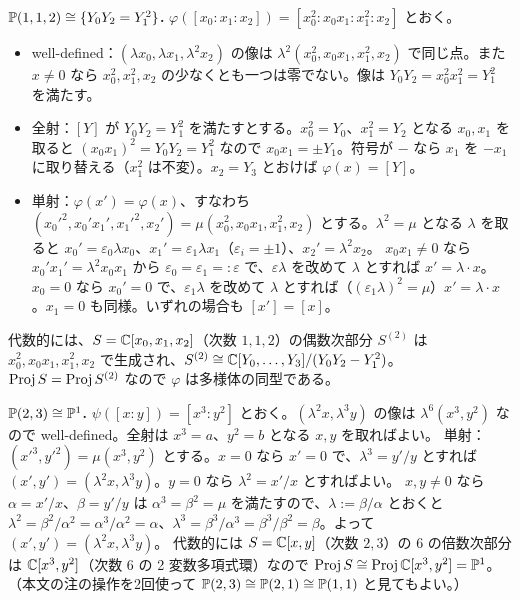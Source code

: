 \textbf{$\mathbb{P}(1,1,2)\cong\{Y_0Y_2 = Y_1^2\}$.}
$\varphi([x_0:x_1:x_2]) = [x_0^2:x_0x_1:x_1^2:x_2]$ とおく。
\begin{itemize}
\item well-defined：$(\lambda x_0,\lambda x_1,\lambda^2x_2)$ の像は $\lambda^2(x_0^2,x_0x_1,x_1^2,x_2)$ で同じ点。また $x\neq0$ なら $x_0^2,x_1^2,x_2$ の少なくとも一つは零でない。像は $Y_0Y_2 = x_0^2x_1^2 = Y_1^2$ を満たす。
\item 全射：$[Y]$ が $Y_0Y_2 = Y_1^2$ を満たすとする。$x_0^2 = Y_0$、$x_1^2 = Y_2$ となる $x_0,x_1$ を取ると $(x_0x_1)^2 = Y_0Y_2 = Y_1^2$ なので $x_0x_1 = \pm Y_1$。符号が $-$ なら $x_1$ を $-x_1$ に取り替える（$x_1^2$ は不変）。$x_2 = Y_3$ とおけば $\varphi(x) = [Y]$。
\item 単射：$\varphi(x') = \varphi(x)$、すなわち $(x_0'^2,x_0'x_1',x_1'^2,x_2') = \mu(x_0^2,x_0x_1,x_1^2,x_2)$ とする。$\lambda^2 = \mu$ となる $\lambda$ を取ると $x_0' = \varepsilon_0\lambda x_0$、$x_1' = \varepsilon_1\lambda x_1$（$\varepsilon_i = \pm1$）、$x_2' = \lambda^2x_2$。
$x_0x_1\neq0$ なら $x_0'x_1' = \lambda^2x_0x_1$ から $\varepsilon_0 = \varepsilon_1 =: \varepsilon$ で、$\varepsilon\lambda$ を改めて $\lambda$ とすれば $x' = \lambda\cdot x$。
$x_0 = 0$ なら $x_0' = 0$ で、$\varepsilon_1\lambda$ を改めて $\lambda$ とすれば（$(\varepsilon_1\lambda)^2 = \mu$）$x' = \lambda\cdot x$。$x_1 = 0$ も同様。いずれの場合も $[x'] = [x]$。
\end{itemize}
代数的には、$S = \mathbb{C}[x_0,x_1,x_2]$（次数 $1,1,2$）の偶数次部分 $S^{(2)}$ は $x_0^2,x_0x_1,x_1^2,x_2$ で生成され、$S^{(2)}\cong\mathbb{C}[Y_0,\dots,Y_3]/(Y_0Y_2-Y_1^2)$。$\operatorname{Proj} S = \operatorname{Proj} S^{(2)}$ なので $\varphi$ は多様体の同型である。

\textbf{$\mathbb{P}(2,3)\cong\mathbb{P}^1$.}
$\psi([x:y]) = [x^3:y^2]$ とおく。$(\lambda^2x,\lambda^3y)$ の像は $\lambda^6(x^3,y^2)$ なので well-defined。全射は $x^3 = a$、$y^2 = b$ となる $x,y$ を取ればよい。
単射：$(x'^3,y'^2) = \mu(x^3,y^2)$ とする。$x = 0$ なら $x' = 0$ で、$\lambda^3 = y'/y$ とすれば $(x',y') = (\lambda^2x,\lambda^3y)$。$y = 0$ なら $\lambda^2 = x'/x$ とすればよい。
$x,y\neq0$ なら $\alpha = x'/x$、$\beta = y'/y$ は $\alpha^3 = \beta^2 = \mu$ を満たすので、$\lambda := \beta/\alpha$ とおくと
$\lambda^2 = \beta^2/\alpha^2 = \alpha^3/\alpha^2 = \alpha$、$\lambda^3 = \beta^3/\alpha^3 = \beta^3/\beta^2 = \beta$。よって $(x',y') = (\lambda^2x,\lambda^3y)$。
代数的には $S = \mathbb{C}[x,y]$（次数 $2,3$）の 6 の倍数次部分は $\mathbb{C}[x^3,y^2]$（次数 $6$ の 2 変数多項式環）なので $\operatorname{Proj} S\cong\operatorname{Proj}\mathbb{C}[x^3,y^2] = \mathbb{P}^1$。
（本文の注の操作を2回使って $\mathbb{P}(2,3)\cong\mathbb{P}(2,1)\cong\mathbb{P}(1,1)$ と見てもよい。）

